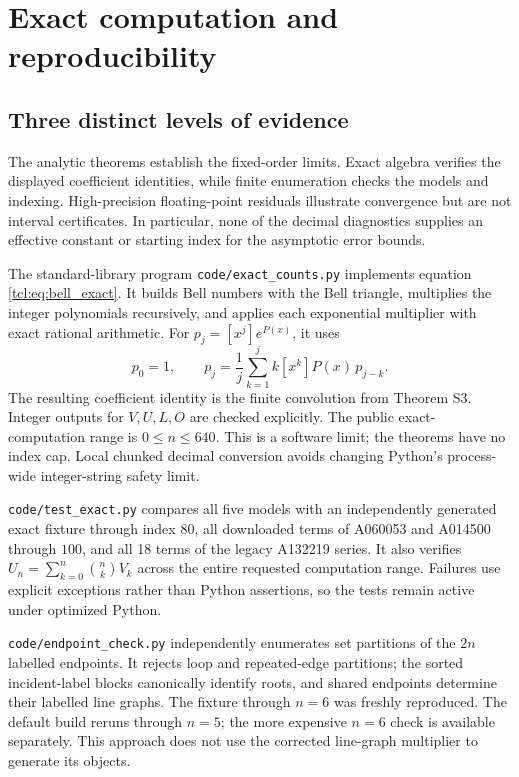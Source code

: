 \section{Exact computation and reproducibility}
\subsection{Three distinct levels of evidence}
The analytic theorems establish the fixed-order limits. Exact algebra verifies the displayed coefficient identities, while finite enumeration checks the models and indexing. High-precision floating-point residuals illustrate convergence but are not interval certificates. In particular, none of the decimal diagnostics supplies an effective constant or starting index for the asymptotic error bounds.

The standard-library program \texttt{code/exact\_counts.py} implements equation \eqref{tcl:eq:bell_exact}. It builds Bell numbers with the Bell triangle, multiplies the integer polynomials recursively, and applies each exponential multiplier with exact rational arithmetic. For $p_j=[x^j]e^{P(x)}$, it uses
\[
p_0=1,\qquad p_j=\frac1j\sum_{k=1}^j k[x^k]P(x)\,p_{j-k}.
\]
The resulting coefficient identity is the finite convolution from Theorem S3. Integer outputs for $V,U,L,O$ are checked explicitly. The public exact-computation range is $0\le n\le640$. This is a software limit; the theorems have no index cap. Local chunked decimal conversion avoids changing Python's process-wide integer-string safety limit.

\texttt{code/test\_exact.py} compares all five models with an independently generated exact fixture through index $80$, all downloaded terms of A060053 and A014500 through $100$, and all 18 terms of the legacy A132219 series. It also verifies $U_n=\sum_{k=0}^n\binom nk V_k$ across the entire requested computation range. Failures use explicit exceptions rather than Python assertions, so the tests remain active under optimized Python.

\texttt{code/endpoint\_check.py} independently enumerates set partitions of the $2n$ labelled endpoints. It rejects loop and repeated-edge partitions; the sorted incident-label blocks canonically identify roots, and shared endpoints determine their labelled line graphs. The fixture through $n=6$ was freshly reproduced. The default build reruns through $n=5$; the more expensive $n=6$ check is available separately. This approach does not use the corrected line-graph multiplier to generate its objects.

